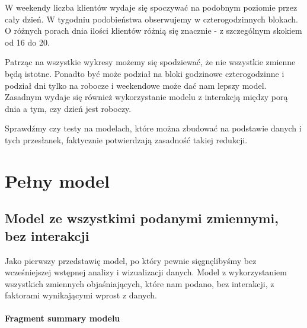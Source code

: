 \documentclass[a4paper,11pt]{article}
\begin{document}
W weekendy liczba klientów wydaje się spoczywać na podobnym poziomie przez cały dzień. W tygodniu podobieństwa obserwujemy w czterogodzinnych blokach. O różnych porach dnia ilości klientów różnią się znacznie - z szczególnym skokiem od 16 do 20.

Patrząc na wszystkie wykresy możemy się spodziewać, że nie wszystkie zmienne będą istotne. Ponadto być może podział na bloki godzinowe czterogodzinne i podział dni tylko na robocze i weekendowe może dać nam lepszy model. Zasadnym wydaje się również wykorzystanie modelu z interakcją między porą dnia a tym, czy dzień jest roboczy.

Sprawdźmy czy testy na modelach, które można zbudować na podstawie danych i tych przesłanek, faktycznie potwierdzają zasadność takiej redukcji. 



\section{Pełny model}

\subsection{Model ze wszystkimi podanymi zmiennymi, bez interakcji}

Jako pierwszy przedstawię model, po który pewnie sięgnęlibyśmy bez wcześniejszej wstępnej analizy i wizualizacji danych. Model z wykorzystaniem wszystkich zmiennych objaśniających, które nam podano, bez interakcji, z faktorami wynikającymi wprost z danych.

\paragraph{Fragment summary modelu}
\end{document}
